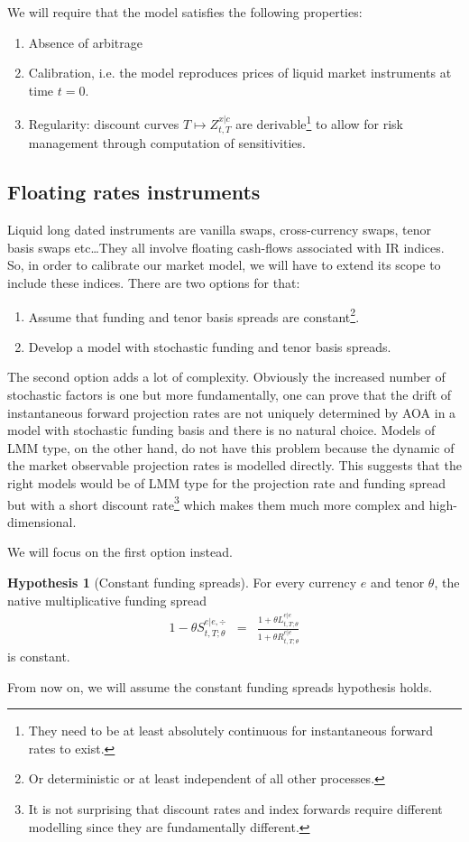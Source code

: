 \documentclass[11pt,english]{amsart}
\theoremstyle{definition}
\newtheorem*{hypo}{Hypothesis}
\begin{document}
We will require that the model satisfies the following properties:
\begin{enumerate}
\item Absence of arbitrage
\item Calibration, i.e. the model reproduces prices of liquid market instruments at time $t = 0$. 
\item Regularity: discount curves $T\mapsto Z^{x|c}_{t,T}$ are derivable\footnote{They need to be at least absolutely continuous for instantaneous forward rates to exist.} to allow for risk management through computation of sensitivities.
\end{enumerate}


\subsection{Floating rates instruments}
Liquid long dated instruments are vanilla swaps, cross-currency swaps, tenor basis swaps etc\ldots They all involve floating cash-flows associated with IR indices. So, in order to calibrate our market model, we will have to extend its scope to include these indices. There are two options for that:
\begin{enumerate}
\item Assume that funding and tenor basis spreads are constant\footnote{Or deterministic or at least independent of all other processes.}.
\item Develop a model with stochastic funding and tenor basis spreads.
\end{enumerate} 

The second option adds a lot of complexity. Obviously the increased number of stochastic factors is one but more fundamentally, one can prove that the drift of instantaneous forward projection rates are not uniquely determined by AOA in a model with stochastic funding basis and there is no natural choice. Models of LMM type, on the other hand, do not have this problem because the dynamic of the market observable projection rates is modelled directly. This suggests that the right models would be of LMM type for the projection rate and funding spread but with a short discount rate\footnote{It is not surprising that discount rates and index forwards require different modelling since they are fundamentally different.} which makes them much more complex and high-dimensional. 


We will focus on the first option instead. 
\begin{hypo}[Constant funding spreads]
For every currency $e$ and tenor $\theta$, the native multiplicative funding spread
\begin{eqnarray}
  1 - \theta S^{e|e,\div}_{t,T;\theta} &=& \frac{1+\theta L^{e|e}_{t,T;\theta}}{1+\theta R^{e|e}_{t,T;\theta}}  
  \label{eq:constant_funding_spread}
\end{eqnarray} 
is constant.
\end{hypo}
From now on, we will assume the constant funding spreads hypothesis holds.
\end{document}
